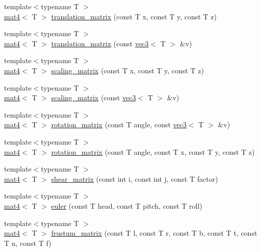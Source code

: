 \begin{DoxyCompactItemize}
\item 
{\footnotesize template$<$typename T $>$ }\\\hyperlink{structvmath_1_1mat4}{mat4}$<$ T $>$ \hyperlink{namespacevmath_af39bac007d71f19403cf8ed549156cf8}{translation\-\_\-matrix} (const T x, const T y, const T z)
\item 
{\footnotesize template$<$typename T $>$ }\\\hyperlink{structvmath_1_1mat4}{mat4}$<$ T $>$ \hyperlink{namespacevmath_a721e36421d311dbeac9c0e16021661df}{translation\-\_\-matrix} (const \hyperlink{structvmath_1_1vec3}{vec3}$<$ T $>$ \&v)
\item 
{\footnotesize template$<$typename T $>$ }\\\hyperlink{structvmath_1_1mat4}{mat4}$<$ T $>$ \hyperlink{namespacevmath_a801245c96c9d351e0e0c9095e9db909f}{scaling\-\_\-matrix} (const T x, const T y, const T z)
\item 
{\footnotesize template$<$typename T $>$ }\\\hyperlink{structvmath_1_1mat4}{mat4}$<$ T $>$ \hyperlink{namespacevmath_a5226633b7a47a9f930891daeab3e7cf0}{scaling\-\_\-matrix} (const \hyperlink{structvmath_1_1vec3}{vec3}$<$ T $>$ \&v)
\item 
{\footnotesize template$<$typename T $>$ }\\\hyperlink{structvmath_1_1mat4}{mat4}$<$ T $>$ \hyperlink{namespacevmath_a29cfa2d2699e8b29de951fbf4c597bd3}{rotation\-\_\-matrix} (const T angle, const \hyperlink{structvmath_1_1vec3}{vec3}$<$ T $>$ \&v)
\item 
{\footnotesize template$<$typename T $>$ }\\\hyperlink{structvmath_1_1mat4}{mat4}$<$ T $>$ \hyperlink{namespacevmath_a7689d3e8fe5ab5835dccdd318deff056}{rotation\-\_\-matrix} (const T angle, const T x, const T y, const T z)
\item 
{\footnotesize template$<$typename T $>$ }\\\hyperlink{structvmath_1_1mat4}{mat4}$<$ T $>$ \hyperlink{namespacevmath_ac4ac7b4a01beab550d282ce8596be2f6}{shear\-\_\-matrix} (const int i, const int j, const T factor)
\item 
{\footnotesize template$<$typename T $>$ }\\\hyperlink{structvmath_1_1mat4}{mat4}$<$ T $>$ \hyperlink{namespacevmath_ad07fd0806742029d1528a9d6f10f580b}{euler} (const T head, const T pitch, const T roll)
\item 
{\footnotesize template$<$typename T $>$ }\\\hyperlink{structvmath_1_1mat4}{mat4}$<$ T $>$ \hyperlink{namespacevmath_af3d39d8e17e8fa9778a6b6da66a145d5}{frustum\-\_\-matrix} (const T l, const T r, const T b, const T t, const T n, const T f)

\end{DoxyCompactItemize}
